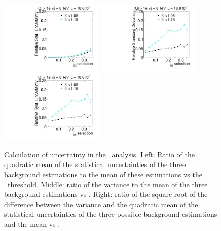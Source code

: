 \begin{figure}
 \begin{center}
 \includegraphics[clip=true, trim=0.0cm 0cm 3.0cm 0cm,width=0.44\textwidth]{figures/multi/Data8TeVCollisionStat}
 \includegraphics[clip=true, trim=0.0cm 0cm 3.0cm 0cm,width=0.44\textwidth]{figures/multi/Data8TeVCollisionStatSyst} \\
 \includegraphics[clip=true, trim=0.0cm 0cm 3.0cm 0cm,width=0.44\textwidth]{figures/multi/Data8TeVCollisionSyst}
\end{center}
\caption[Statistical and systematic uncertainty in the background prediction for different sets of thresholds in the \multi\ analysis]
{
Calculation of uncertainty in the \multi\ analysis.
Left: Ratio of the quadratic
mean of the statistical uncertainties of the three background
estimations to the mean of these estimations vs
the \ias\ threshold. Middle: ratio of the variance to the mean of the three
background estimations vs \ias. Right: ratio of the
square root of the difference between the variance and the quadratic
mean of the statistical uncertainties  of the three possible background
estimations and the mean vs \ias.
}
\label{fig:mCHAMPcorr2}
\end{figure}

